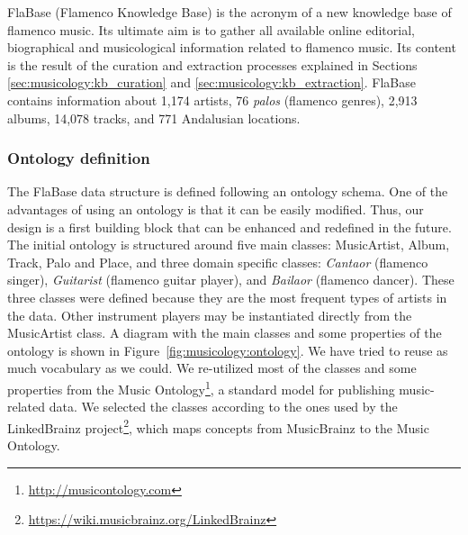 FlaBase (Flamenco Knowledge Base) is the acronym of a new knowledge base of flamenco music. Its ultimate aim is to gather all available online editorial, biographical and musicological information related to flamenco music. Its content is the result of the curation and extraction processes explained in Sections \ref{sec:musicology:kb_curation} and \ref{sec:musicology:kb_extraction}. %
FlaBase contains information about 1,174 artists, 76 \textit{palos} (flamenco genres), 2,913 albums, 14,078 tracks, and 771 Andalusian locations.


\subsubsection{Ontology definition}
\label{sec:musicology:ontology}

The FlaBase data structure is defined following an ontology schema. One of the advantages of using an ontology is that it can be easily modified. Thus, our design is a first building block that can be enhanced and redefined in the future. The initial ontology is structured around five main classes: MusicArtist, Album, Track, Palo and Place, and three domain specific classes: \textit{Cantaor} (flamenco singer), \textit{Guitarist} (flamenco guitar player), and \textit{Bailaor} (flamenco dancer). These three classes were defined because they are the most frequent types of artists in the data. Other instrument players may be instantiated directly from the MusicArtist class. 
A diagram with the main classes and some properties of the ontology is shown in Figure~\ref{fig:musicology:ontology}.
We have tried to reuse as much vocabulary as we could. We re-utilized most of the classes and some properties from the Music Ontology\footnote{\url{http://musicontology.com}}, a standard model for publishing music-related data. We selected the classes according to the ones used by the LinkedBrainz project\footnote{\url{https://wiki.musicbrainz.org/LinkedBrainz}}, which maps concepts from MusicBrainz to the Music Ontology.

